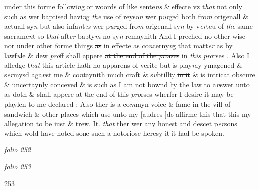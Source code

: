 \documentclass[12pt, a4paper]{book}
\begin{document}
			under this forme followi\textit{n}g or woords of 
like sente\textit{ns} \& effecte vz t\textit{hat} not only such as wer baptised havi\textit{n}g \textit{the} use of reyso\textit{n}
wer p\textit{ur}ged both fro\textit{m} origenall \& actuall sy\textit{n} but also infa\textit{n}t\textit{es} wer p\textit{ur}ged fro\textit{m} origenall sy\textit{n} by v\textit{er}teu of \textit{the} same sacrame\textit{n}t so t\textit{hat} aft\textit{er} bapty\textit{m} no sy\textit{n} remaynith And
I preched no other wise nor under other forme
			 things \sout{as} in effecte as co\textit{n}cerny\textit{n}g that matt\textit{er} as by lawf\textit{u}le \& dew
\textit{pro}ff shall appere \sout{at the end of the \textit{pro}rses}
               in \textit{this pro}rses
			. Also I alledge t\textit{hat} this article hath no
apparens of verite but is play\textit{n}ly ymagened \& s\textit{er}mysd aga\textit{n}st me \& co\textit{n}taynith
much craft \& s\textit{u}btillty \sout{in it}
               \& is intricat obscure \& uncertaynly conceved
			 \& is such as I am not bownd by the law to
a\textit{n}swer unto as doth \& shall appere at the end of this \textit{pro}rses wherfor I desire it may be playlen to me declared
			 : Also ther is
a co\textit{m}myn voice \& fame in the vill
			 of sandwich \& other places which use unto my [audres ]do affirme this 
that this my allegation to be iust \& trew. It. \textit{that} ther wer any honest and descet p\textit{er}sons
which wold have noted sone such a notoriose heresy it it had be spoken.

\dotfill
						\newpage
{}

\textit{folio 252}


         \vspace*{4cm}
         
\dotfill
						

\textit{folio 253}


\begin{flushright}{\color{Mahogany}253}\end{flushright}
\end{document}

